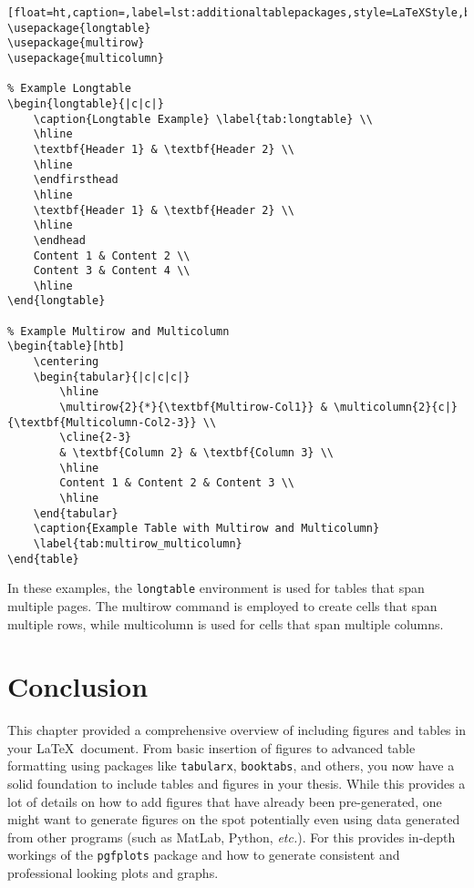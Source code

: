 		\begin{lstlisting}[float=ht,caption=,label=lst:additionaltablepackages,style=LaTeXStyle,basicstyle=\small\ttfamily,]
\usepackage{longtable}
\usepackage{multirow}
\usepackage{multicolumn}

% Example Longtable
\begin{longtable}{|c|c|}
	\caption{Longtable Example} \label{tab:longtable} \\
	\hline
	\textbf{Header 1} & \textbf{Header 2} \\
	\hline
	\endfirsthead
	\hline
	\textbf{Header 1} & \textbf{Header 2} \\
	\hline
	\endhead
	Content 1 & Content 2 \\
	Content 3 & Content 4 \\
	\hline
\end{longtable}

% Example Multirow and Multicolumn
\begin{table}[htb]
	\centering
	\begin{tabular}{|c|c|c|}
		\hline
		\multirow{2}{*}{\textbf{Multirow-Col1}} & \multicolumn{2}{c|}{\textbf{Multicolumn-Col2-3}} \\
		\cline{2-3}
		& \textbf{Column 2} & \textbf{Column 3} \\
		\hline
		Content 1 & Content 2 & Content 3 \\
		\hline
	\end{tabular}
	\caption{Example Table with Multirow and Multicolumn}
	\label{tab:multirow_multicolumn}
\end{table}
		\end{lstlisting}

		In these examples, the \texttt{longtable} environment is used for tables that span multiple pages. 
		The multirow command is employed to create cells that span multiple rows, while multicolumn is used for cells that span multiple columns.

	\section{Conclusion}
		This chapter provided a comprehensive overview of including figures and tables in your \LaTeX\ document. 
		From basic insertion of figures to advanced table formatting using packages like \texttt{tabularx}, \texttt{booktabs}, and others, you now have a solid foundation to include tables and figures in your thesis.
		While this provides a lot of details on how to add figures that have already been pre-generated, one might want to generate figures on the spot potentially even using data generated from other programs (such as MatLab\textsuperscript{\tiny\textregistered}, Python, \textit{etc.}).
		For this  provides in-depth workings of the \texttt{pgfplots} package and how to generate consistent and professional looking plots and graphs.